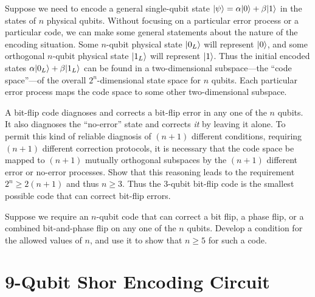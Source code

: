 \documentclass{../phys084}
\begin{document}
\begin{exercise}
  Suppose we need to encode a general single-qubit state
  \(\lvert\psi\rangle = \alpha\lvert0\rangle + \beta \lvert1\rangle\) in the states of \(n\)
  physical qubits.  Without focusing on a particular error process or
  a particular code, we can make some general statements about the
  nature of the encoding situation.  Some \(n\)-qubit physical state
  \(\lvert0_L\rangle\) will represent \(\lvert0\rangle\), and some orthogonal
  \(n\)-qubit physical state \(\lvert1_L\rangle\) will represent \(\lvert1\rangle\).
  Thus the initial encoded states \(\alpha\lvert0_L\rangle + \beta\lvert1_L\rangle\)
  can be found in a two-dimensional subspace---the ``code space''---of
  the overall \(2^n\)-dimensional state space for \(n\) qubits.  Each
  particular error process maps the code space to some other
  two-dimensional subspace.
  \begin{problems}
  \item A bit-flip code diagnoses and corrects a bit-flip error in any
    one of the \(n\) qubits.  It also diagnoses the ``no-error'' state
    and corrects \textit{it} by leaving it alone.  To permit this kind
    of reliable diagnosis of \((n+1)\) different conditions, requiring
    \((n+1)\) different correction protocols, it is necessary that the
    code space be mapped to \((n+1)\) mutually orthogonal subspaces by
    the \((n+1)\) different error or no-error processes.  Show that
    this reasoning leads to the requirement \(2^n \geq 2(n+1)\) and
    thus \(n \geq 3\).  Thus the 3-qubit bit-flip code is the smallest
    possible code that can correct bit-flip errors.
  \item Suppose we require an \(n\)-qubit code that can correct a bit
    flip, a phase flip, or a combined bit-and-phase flip on any one of
    the \(n\) qubits.  Develop a condition for the allowed values of
    \(n\), and use it to show that \(n \geq 5\) for such a code.
  \end{problems}
\end{exercise}

\begin{solution}
  \begin{problems}
  \item
  \item
  \end{problems}
\end{solution}

\section{9-Qubit Shor Encoding Circuit}
\end{document}
